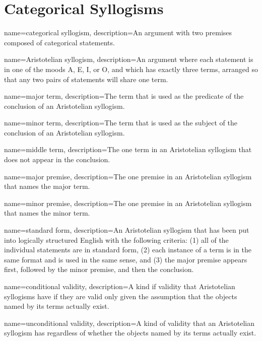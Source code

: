 \chapter{Categorical Syllogisms}\label{ch:catsyllogisms}

{
name=categorical syllogism,
description={An argument with two premises composed of categorical statements.}
}

{
name=Aristotelian syllogism,
description={An argument where each statement is in one of the moods A, E, I, or O, and which has exactly three terms, arranged so that any two pairs of statements will share one term.}
}

{
name=major term,
description={The term that is used as the predicate of the conclusion of an Aristotelian syllogism.}
}

{
name=minor term,
description={The term that is used as the subject of the conclusion of an Aristotelian syllogism.}
}

{
name=middle term,
description={The one term in an Aristotelian syllogism that does not appear in the conclusion.}
}

{
name=major premise,
description={The one premise in an Aristotelian syllogism that names the major term.}
}

{
name=minor premise,
description={The one premise in an Aristotelian syllogism that names the minor term.}
}

{
name=standard form,
description={An Aristotelian syllogism that has been put into logically structured English with the following criteria: (1) all of the individual statements are in standard form, (2) each instance of a term is in the same format and is used in the same sense, and (3) the major premise appears first, followed by the minor premise, and then the conclusion.}
}

{
name=conditional validity,
description={A kind if validity that Aristotelian syllogisms have if they are valid only given the assumption that the objects named by its terms actually exist.}
}

{
name=unconditional validity,
description={A kind of validity that an Aristotelian syllogism has regardless of whether the objects named by its terms actually exist.}
}


